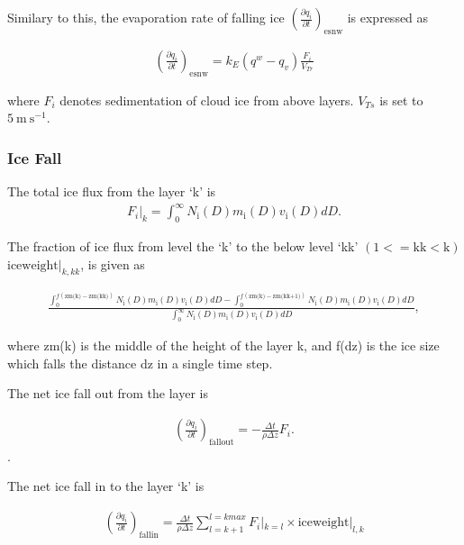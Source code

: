 Similary to this, the evaporation rate of falling ice
\(\left(\frac{\partial q_i}{\partial t}\right)_{\text {esnw}}\) is
expressed as

\begin{eqnarray}
\left(\frac{\partial q_i}{\partial t}\right)_{\text {esnw}}
=k_{E}\left(q^{w}-q_v\right) \frac{F_i}{V_{Tr}}
\end{eqnarray}

where \(F_i\) denotes sedimentation of cloud ice from above layers.
\(V_{Ts}\) is set to \(5\mathrm{~m} \mathrm{~s}^{-1}\).

\hypertarget{ice-fall}{%
\subsubsection{Ice Fall}\label{ice-fall}}

The total ice flux from the layer `k' is \begin{eqnarray}
F_i|_k = \int^\infty_0 N_{\mathrm{i}}(D) m_{\mathrm{i}}(D) v_{\text {i}}(D)dD.
\end{eqnarray}

The fraction of ice flux from level the `k' to the below level `kk'
\((1<=\text{kk}<\text{k})\) \(\text{iceweight}|_{k,kk}\), is given as

\begin{eqnarray}
\frac{\int^{f(\text{zm(k)}-\text{zm(kk)})}_0 N_{\mathrm{i}}(D) m_{\mathrm{i}}(D) v_{\text {i}}(D)dD-
\int^{f(\text{zm(k)}-\text{zm(kk+1)})}_0 N_{\mathrm{i}}(D) m_{\mathrm{i}}(D) v_{\text {i}}(D)dD}
{\int^\infty_0 N_{\mathrm{i}}(D) m_{\mathrm{i}}(D) v_{\text {i}}(D)dD},
\end{eqnarray}

where zm(k) is the middle of the height of the layer k, and f(dz) is the
ice size which falls the distance dz in a single time step.

The net ice fall out from the layer is

\begin{eqnarray}
\left(\frac{\partial q_i}{\partial t}\right)_{\text {fallout}}
=-\frac{\Delta t}{\rho \Delta z}F_i.
\end{eqnarray}.

The net ice fall in to the layer `k' is

\begin{eqnarray}
\left(\frac{\partial q_i}{\partial t}\right)_{\text {fallin}}
=\frac{\Delta t}{\rho \Delta z} \sum^{l=kmax}_{l=k+1}F_i|_{k=l} \times \text{iceweight}|_{l,k}
\end{eqnarray}

